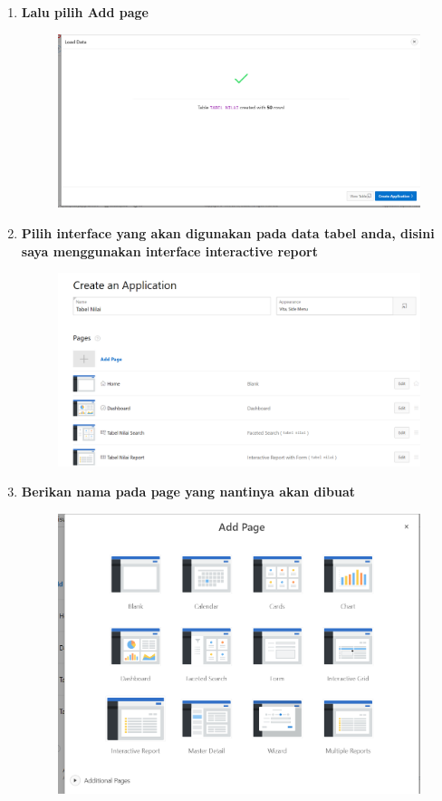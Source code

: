\begin{enumerate}
\item \textbf{Lalu pilih Add page}
\begin{figure}[H]
    \centering
    \includegraphics[scale=0.3]{figures/17.png}
    \label{15}
\end{figure}

\item \textbf{Pilih interface yang akan digunakan pada data tabel anda, disini saya menggunakan interface interactive report}
\begin{figure}[H]
    \centering
    \includegraphics[scale=0.3]{figures/18.png}
    \label{16}
\end{figure}


\item \textbf{Berikan nama pada page yang nantinya akan dibuat}
\begin{figure}[H]
    \centering
    \includegraphics[scale=0.3]{figures/19.png}
    \label{17}
\end{figure}



\end{enumerate}
